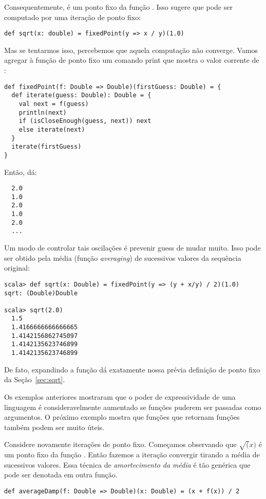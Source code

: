 Consequentemente,  \'{e} um ponto fixo da fun\c{c}\~{a}o .
Isso sugere que  pode ser computado por uma itera\c{c}\~{a}o de ponto fixo: 
\begin{lstlisting}
def sqrt(x: double) = fixedPoint(y => x / y)(1.0)
\end{lstlisting}
Mas se tentarmos isso, percebemos que aquela computa\c{c}\~{a}o n\~{a}o converge. 
Vamos agregar à fun\c{c}\~{a}o de ponto fixo um comando print que mostra o 
valor corrente de : 
\begin{lstlisting}
def fixedPoint(f: Double => Double)(firstGuess: Double) = {
  def iterate(guess: Double): Double = {
    val next = f(guess)
    println(next)
    if (isCloseEnough(guess, next)) next
    else iterate(next)
  }
  iterate(firstGuess)
}
\end{lstlisting}
Ent\~{a}o,  d\'{a}: 
\begin{lstlisting}
  2.0
  1.0
  2.0
  1.0
  2.0
  ...
\end{lstlisting}

Um modo de controlar tais oscila\c{c}\~{o}es \'{e} prevenir guess de mudar muito.
Isso pode ser obtido pela m\'{e}dia (fun\c{c}\~{a}o {\em averaging}) de sucessivos valores da sequ\^{e}ncia 
original:
\begin{lstlisting}
scala> def sqrt(x: Double) = fixedPoint(y => (y + x/y) / 2)(1.0)
sqrt: (Double)Double

scala> sqrt(2.0)
  1.5
  1.4166666666666665
  1.4142156862745097
  1.4142135623746899
  1.4142135623746899
\end{lstlisting}
De fato, expandindo a fun\c{c}\~{a}o  d\'{a} exatamente nossa pr\'{e}via
defini\c{c}\~{a}o de ponto fixo da Se\c{c}\~{a}o~\ref{sec:sqrt}.

Os exemplos anteriores mostraram que o poder de expressividade de uma linguagem 
\'{e} consideravelmente aumentado se fun\c{c}\~{o}es puderem ser passadas como argumentos.
O pr\'{o}ximo exemplo mostra que fun\c{c}\~{o}es que retornam fun\c{c}\~{o}es tamb\'{e}m podem ser
muito \'{u}teis.

Considere novamente itera\c{c}\~{o}es de ponto fixo. Come\c{c}amos observando que 
$\sqrt(x)$ \'{e} um ponto fixo da fun\c{c}\~{a}o . Ent\~{a}o fazemos
a itera\c{c}\~{a}o convergir tirando a m\'{e}dia de sucessivos valores. Essa t\'{e}cnica
de {\em amortecimento da m\'{e}dia} \'{e} t\~{a}o gen\'{e}rica que pode ser denotada
em outra fun\c{c}\~{a}o.
\begin{lstlisting}
def averageDamp(f: Double => Double)(x: Double) = (x + f(x)) / 2
\end{lstlisting}

